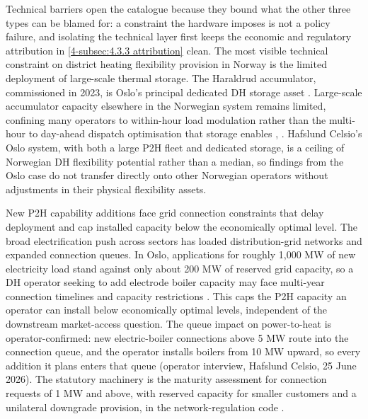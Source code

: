 Technical barriers open the catalogue because they bound what the other three types can be blamed for: a constraint the hardware imposes is not a policy failure, and isolating the technical layer first keeps the economic and regulatory attribution in \autoref{4-subsec:4.3.3 attribution} clean. The most visible technical constraint on district heating flexibility provision in Norway is the limited deployment of large-scale thermal storage. The Haraldrud accumulator, commissioned in 2023, is Oslo's principal dedicated DH storage asset \cite{nve_konsesjonssak_2026}. Large-scale accumulator capacity elsewhere in the Norwegian system remains limited, confining many operators to within-hour load modulation rather than the multi-hour to day-ahead dispatch optimisation that storage enables \cite{hennessy_flexibility_2019}, \cite{sandberg_framework_2018}. Hafslund Celsio's Oslo system, with both a large P2H fleet and dedicated storage, is a ceiling of Norwegian DH flexibility potential rather than a median, so findings from the Oslo case do not transfer directly onto other Norwegian operators without adjustments in their physical flexibility assets. 

New P2H capability additions face grid connection constraints that delay deployment and cap installed capacity below the economically optimal level. The broad electrification push across sectors has loaded distribution-grid networks and expanded connection queues. In Oslo, applications for roughly 1,000 MW of new electricity load stand against only about 200 MW of reserved grid capacity, so a DH operator seeking to add electrode boiler capacity may face multi-year connection timelines and capacity restrictions \cite{Thema_fjernvarme_2024}. This caps the P2H capacity an operator can install below economically optimal levels, independent of the downstream market-access question.
The queue impact on power-to-heat is operator-confirmed: new electric-boiler connections above 5 MW route into the connection queue, and the operator installs boilers from 10 MW upward, so every addition it plans enters that queue (operator interview, Hafslund Celsio, 25 June 2026). The statutory machinery is the maturity assessment for connection requests of 1 MW and above, with reserved capacity for smaller customers and a unilateral downgrade provision, in the network-regulation code \cite{energidepartementet_forskrift_2019}.

